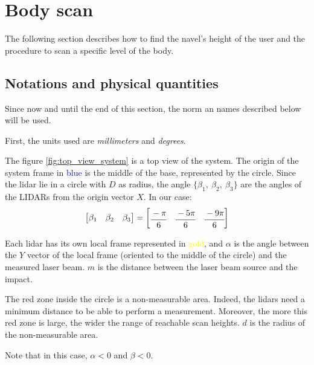 \documentclass{article}
\newcommand{\vsp}{\vspace{\baselineskip}}
\begin{document}
\section{Body scan}

The following section describes how to find the navel's height of the user and the procedure to scan a specific level of the body.

\subsection{Notations and physical quantities} \label{sec:notations}

Since now and until the end of this section, the norm an names described below will be used. 

\vsp

First, the units used are \textit{millimeters} and \textit{degrees}.

\vsp

The figure \ref{fig:top_view_system} is a top view of the system. The origin of the system frame in \textcolor{blue}{blue} is the middle of the base, represented by the circle. Since the lidar lie in a circle with $D$ as radius, the angle $\{ \beta_1,\ \beta_2,\ \beta_3 \}$ are the angles of the LIDARs from the origin vector $X$. In our case:
$$
\begin{bmatrix}
    \beta_1 &
    \beta_2 & 
    \beta_3 
\end{bmatrix}
=
\begin{bmatrix}
    \cfrac{- \pi}{6} &
    \cfrac{-5\pi}{6} & 
    \cfrac{-9\pi}{6} 
\end{bmatrix}
$$

\vsp

Each lidar has its own local frame represented in \textcolor{yellow}{gold}, and $\alpha$ is the angle between the $Y$ vector of the local frame (oriented to the middle of the circle) and the measured laser beam. $m$ is the distance between the laser beam source and the impact.

\vsp

The red zone inside the circle is a non-measurable area. Indeed, the lidars need a minimum distance to be able to perform a measurement. Moreover, the more this red zone is large, the wider the range of reachable scan heights. $d$ is the radius of the non-measurable area.

\vsp

Note that in this case, $\alpha < 0$ and $\beta < 0$.
\end{document}
